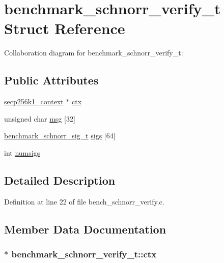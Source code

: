 \hypertarget{structbenchmark__schnorr__verify__t}{}\section{benchmark\+\_\+schnorr\+\_\+verify\+\_\+t Struct Reference}
\label{structbenchmark__schnorr__verify__t}


Collaboration diagram for benchmark\+\_\+schnorr\+\_\+verify\+\_\+t\+:
\subsection*{Public Attributes}
\begin{DoxyCompactItemize}
\item 
\hyperlink{secp256k1_8h_a282ec9e6dfec8c35955c3eb2f7476e5e}{secp256k1\+\_\+context} $\ast$ \hyperlink{structbenchmark__schnorr__verify__t_add37fb6de4d6b469d94b83b5b76a0a18}{ctx}
\item 
unsigned char \hyperlink{structbenchmark__schnorr__verify__t_a5230ec380d2ccfe3061b6b5f431cd466}{msg} \mbox{[}32\mbox{]}
\item 
\hyperlink{structbenchmark__schnorr__sig__t}{benchmark\+\_\+schnorr\+\_\+sig\+\_\+t} \hyperlink{structbenchmark__schnorr__verify__t_a2ae41817934debad3a4f17f101eee0a1}{sigs} \mbox{[}64\mbox{]}
\item 
int \hyperlink{structbenchmark__schnorr__verify__t_af57633e576212bd6fe660a7722c1228f}{numsigs}
\end{DoxyCompactItemize}


\subsection{Detailed Description}


Definition at line 22 of file bench\+\_\+schnorr\+\_\+verify.\+c.



\subsection{Member Data Documentation}
\hypertarget{structbenchmark__schnorr__verify__t_add37fb6de4d6b469d94b83b5b76a0a18}{}
\subsubsection[{ctx}]{$\ast$ benchmark\+\_\+schnorr\+\_\+verify\+\_\+t\+::ctx}\label{structbenchmark__schnorr__verify__t_add37fb6de4d6b469d94b83b5b76a0a18}


